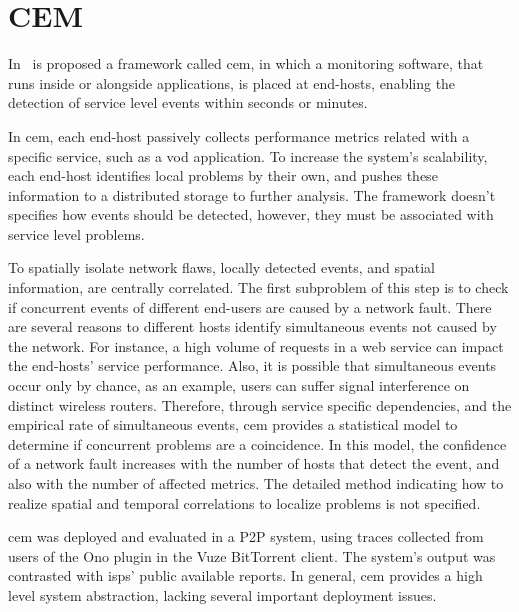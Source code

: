 \section{CEM}

In~\cite{crowdsourcing_service_level_network_event_monitoring} is proposed a
framework called \gls*{cem}, in which a
monitoring software, that runs inside or alongside applications, is placed at
end-hosts, enabling the detection of service level events within seconds or
minutes.

In \gls*{cem}, each end-host passively collects performance metrics related with
a specific service, such as a \gls*{vod} application.
To increase the system's scalability,
each end-host identifies local problems by their own,
and pushes these information to a distributed storage to further analysis.
The framework doesn't specifies how events should be detected,
however, they must be associated with service level problems.

To spatially isolate network flaws, locally detected events, and spatial
information, are centrally correlated.
The first subproblem of this step is to check if concurrent events
of different end-users are caused by a
network fault. There are several reasons to different hosts identify
simultaneous events not caused by the network.
For instance, a high volume of requests in a web service can impact the
end-hosts' service performance. Also, it is
possible that simultaneous events occur only by chance, as an example, users
can suffer signal interference on distinct wireless routers.
Therefore, through service specific dependencies, and the empirical rate of
simultaneous
events, \gls*{cem} provides a statistical model to determine if
concurrent problems are a coincidence.
In this model, the confidence of a network fault increases with the
number of hosts that detect the event, and also with the number of affected
metrics.
The detailed method indicating how to realize spatial and temporal
correlations to
localize problems is not specified.

\gls*{cem} was deployed and evaluated in a P2P system, using traces
collected
from users of the Ono plugin in the Vuze BitTorrent client. The system's
output was contrasted with \glspl*{isp}' public available reports. In general,
\gls*{cem} provides a high level system abstraction, lacking several
important deployment issues.
